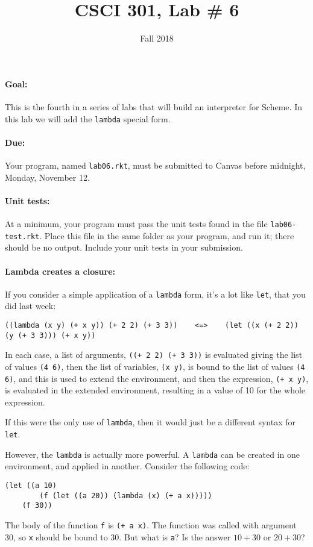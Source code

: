 \documentclass{article}
\title{CSCI 301, Lab \# 6}
\author{Fall 2018}
\date{}
\begin{document}
\maketitle


\paragraph{Goal:} This is the fourth in a series of labs that will
build an interpreter for Scheme.  In this lab we will add the {\tt lambda}
special form.

\paragraph{Due:} Your program, named {\tt lab06.rkt}, must be submitted to
Canvas before midnight, Monday, November 12.

\paragraph{Unit tests:}
At a minimum, your program must pass the unit tests found in the
file {\tt lab06-test.rkt}.  Place this file in the same folder
as your program, and run it;  there should be no output.  Include
your unit tests in your submission.

\paragraph{Lambda creates a closure:}

If you consider a simple application of a {\tt lambda} form, it's a lot like
{\tt let}, that you did last week:
\begin{Verbatim}
((lambda (x y) (+ x y)) (+ 2 2) (+ 3 3))    <=>    (let ((x (+ 2 2)) (y (+ 3 3))) (+ x y))
\end{Verbatim}
In each case, a list of arguments, {\tt ((+ 2 2) (+ 3 3))} is evaluated
giving the list of values {\tt (4 6)}, then
the list of variables, {\tt (x y)}, is bound to the list
of values {\tt (4 6)}, and this is used to extend the environment,
and then the expression, {\tt (+ x y)}, is evaluated in the extended
environment, resulting in a value of 10 for the whole expression.

If this were the only use of {\tt lambda}, then it would just be a different
syntax for {\tt let}.

However, the {\tt lambda} is actually more powerful.  A {\tt lambda}
can be created in one environment, and applied in another.  Consider
the following code:
\begin{Verbatim}[frame=single]
  (let ((a 10)
        (f (let ((a 20)) (lambda (x) (+ a x)))))
    (f 30))
\end{Verbatim}
The body of the function {\tt f} is {\tt (+ a x)}.  The function was
called with argument 30, so {\tt x} should be bound to 30.  But what
is {\tt a}? 
Is the answer $10+30$ or $20+30$? 
\end{document}
